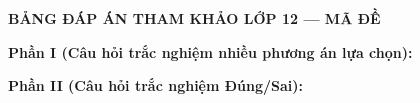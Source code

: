 
\newpage
\begin{center} \textbf{BẢNG ĐÁP ÁN THAM KHẢO LỚP 12 --- MÃ ĐỀ \thedeso} \end{center}

\noindent \textbf{Phần I (Câu hỏi trắc nghiệm nhiều phương án lựa chọn):}  

\noindent \textbf{Phần II (Câu hỏi trắc nghiệm Đúng/Sai):}

\label{B\thedeso}

